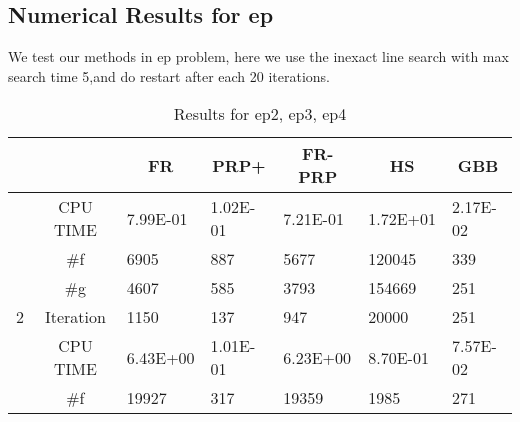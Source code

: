\documentclass{article}
\begin{document}
\subsection{Numerical Results for ep}
We test our methods in ep problem, here we use the inexact line search with max search time 5,and do restart after each 20 iterations.
\begin{table}[H]
	\caption{Results for ep2, ep3, ep4}
			\centering
	\begin{tabular}{|c|c|l|l|l|l|l|}
		\hline
		&           & \multicolumn{1}{c|}{FR}         & \multicolumn{1}{c|}{PRP+}       & \multicolumn{1}{c|}{FR-PRP}     & \multicolumn{1}{c|}{HS}         & \multicolumn{1}{c|}{GBB}        \\ \hline
		& CPU TIME  & {\color[HTML]{000000} 7.99E-01} & {\color[HTML]{000000} 1.02E-01} & {\color[HTML]{000000} 7.21E-01} & {\color[HTML]{000000} 1.72E+01} & {\color[HTML]{000000} 2.17E-02} \\ \cline{2-7} 
		& \#f       & {\color[HTML]{000000} 6905}     & {\color[HTML]{000000} 887}      & {\color[HTML]{000000} 5677}     & {\color[HTML]{000000} 120045}   & {\color[HTML]{000000} 339}      \\ \cline{2-7} 
		& \#g       & {\color[HTML]{000000} 4607}     & {\color[HTML]{000000} 585}      & {\color[HTML]{000000} 3793}     & {\color[HTML]{000000} 154669}   & {\color[HTML]{000000} 251}      \\ \cline{2-7} 
		\multirow{-4}{*}{2} & Iteration & {\color[HTML]{000000} 1150}     & {\color[HTML]{000000} 137}      & {\color[HTML]{000000} 947}      & {\color[HTML]{000000} 20000}    & {\color[HTML]{000000} 251}      \\ \hline
		& CPU TIME  & {\color[HTML]{000000} 6.43E+00} & {\color[HTML]{000000} 1.01E-01} & {\color[HTML]{000000} 6.23E+00} & {\color[HTML]{000000} 8.70E-01} & {\color[HTML]{000000} 7.57E-02} \\ \cline{2-7} 
		& \#f       & {\color[HTML]{000000} 19927}    & {\color[HTML]{000000} 317}      & {\color[HTML]{000000} 19359}    & {\color[HTML]{000000} 1985}     & {\color[HTML]{000000} 271}      \\ \cline{2-7} 

\end{tabular}
\end{table}
\end{document}
